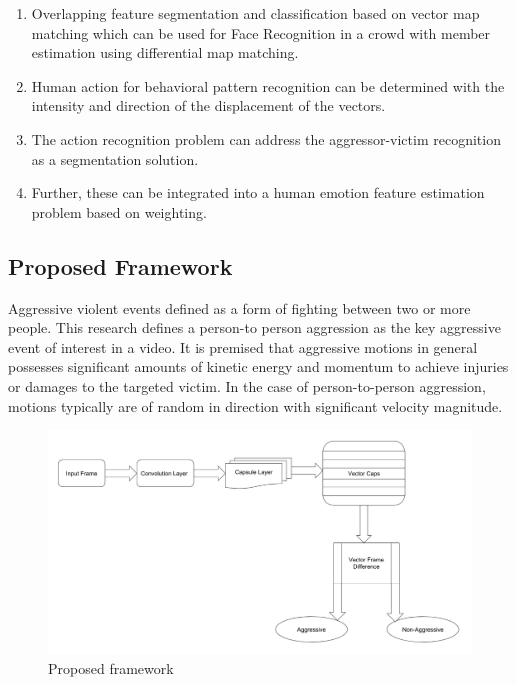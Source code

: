 \documentclass[11pt,english]{article}
\begin{document}
\begin{enumerate}
\item Overlapping feature segmentation and classification based on vector map matching which can be used for Face Recognition in a crowd with member estimation using differential map matching.
\item Human action for behavioral pattern recognition can be determined with the intensity and direction of the displacement of the vectors.
\item The action recognition problem can address the aggressor-victim recognition as a segmentation solution.

\item Further, these can be integrated into a human emotion feature estimation problem based on weighting. 

\end{enumerate}

\subsection{Proposed Framework}
Aggressive violent events defined as a form of fighting between two or more people. This
research defines a person-to person aggression as the key aggressive event of interest in a video. It
is premised that aggressive motions in general possesses significant amounts of kinetic energy and
momentum to achieve injuries or damages to the targeted victim. In the case of person-to-person
aggression, motions typically are of random in direction with significant velocity magnitude.
\begin{figure}
\centering
\includegraphics[width=1\textwidth]{capsframe.png}
\caption{\label{fig:framework}Proposed framework }
\end{figure}
\end{document}
